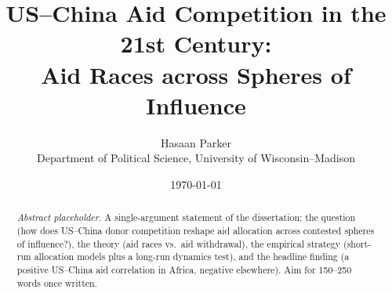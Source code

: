 \documentclass[12pt]{report}
\title{US--China Aid Competition in the 21st Century:\\
       \large Aid Races across Spheres of Influence}
\author{Hasaan Parker \\ \small{Department of Political Science, University of Wisconsin--Madison}}
\date{\today}
\begin{document}
\maketitle

\begin{abstract}
\noindent
\textit{Abstract placeholder.} A single-argument statement of the dissertation:
the question (how does US--China donor competition reshape aid allocation
across contested spheres of influence?), the theory (aid races vs.\ aid
withdrawal), the empirical strategy (short-run allocation models plus a
long-run dynamics test), and the headline finding (a positive US--China aid
correlation in Africa, negative elsewhere). Aim for 150--250 words once written.
\end{abstract}

\tableofcontents









\end{document}
